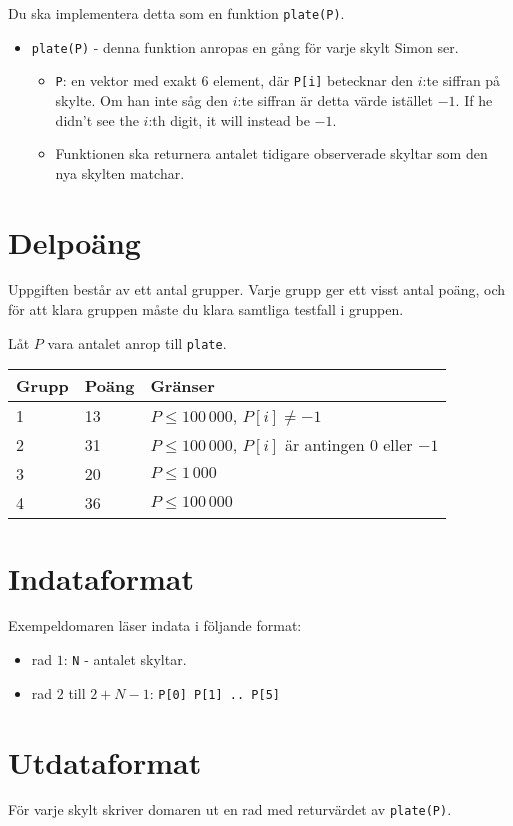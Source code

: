 Du ska implementera detta som en funktion \texttt{plate(P)}.
\begin{itemize}
  \item \texttt{plate(P)} - denna funktion anropas en gång för varje skylt Simon ser.
  \begin{itemize}
    \item \texttt{P}: en vektor med exakt 6 element, där \texttt{P[i]} betecknar den $i$:te siffran på skylte.
      Om han inte såg den $i$:te siffran är detta värde istället $-1$.
      If he didn't see the $i$:th digit, it will instead be $-1$.
    \item Funktionen ska returnera antalet tidigare observerade skyltar som den nya skylten matchar.
  \end{itemize}
\end{itemize}

\section*{Delpoäng}
Uppgiften består av ett antal grupper. Varje grupp ger ett visst antal poäng, och för att klara
gruppen måste du klara samtliga testfall i gruppen.

Låt $P$ vara antalet anrop till \texttt{plate}.

\begin{tabular}{|l|l|l|}
  \hline
  \textbf{Grupp} & \textbf{Poäng} & \textbf{Gränser} \\ \hline
  1 & 13 & $P \le 100\,000$, $P[i] \not= -1$ \\ \hline
  2 & 31 & $P \le 100\,000$, $P[i]$ är antingen $0$ eller $-1$ \\ \hline
  3 & 20 & $P \le 1\,000$ \\ \hline
  4 & 36 & $P \le 100\,000$ \\ \hline
\end{tabular}


\section*{Indataformat}
Exempeldomaren läser indata i följande format:

\begin{itemize}
  \item rad $1$: \texttt{N} - antalet skyltar.
  \item rad $2$ till $2 + N - 1$: \texttt{P[0] P[1] .. P[5]}
\end{itemize}

\section*{Utdataformat}
För varje skylt skriver domaren ut en rad med returvärdet av \texttt{plate(P)}.
